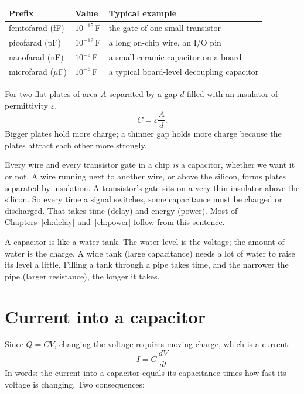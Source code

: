 \begin{center}
\begin{tabular}{lll}
\toprule
Prefix & Value & Typical example \\
\midrule
femtofarad (fF) & $10^{-15}$\,F & the gate of one small transistor \\
picofarad (pF) & $10^{-12}$\,F & a long on-chip wire, an I/O pin \\
nanofarad (nF) & $10^{-9}$\,F & a small ceramic capacitor on a board \\
microfarad ($\mu$F) & $10^{-6}$\,F & a typical board-level decoupling capacitor \\
\bottomrule
\end{tabular}
\end{center}

For two flat plates of area $A$ separated by a gap $d$ filled with an insulator of permittivity $\varepsilon$,
\[
  C = \varepsilon \frac{A}{d}.
\]
Bigger plates hold more charge; a thinner gap holds more charge because the plates attract each other more strongly.

\begin{bigidea}
Every wire and every transistor gate in a chip \emph{is} a capacitor, whether we want it or not. A wire running next to another wire, or above the silicon, forms plates separated by insulation. A transistor's gate sits on a very thin insulator above the silicon. So every time a signal switches, some capacitance must be charged or discharged. That takes time (delay) and energy (power). Most of Chapters~\ref{ch:delay} and~\ref{ch:power} follow from this sentence.
\end{bigidea}

\begin{everyday}
A capacitor is like a water tank. The water level is the voltage; the amount of water is the charge. A wide tank (large capacitance) needs a lot of water to raise its level a little. Filling a tank through a pipe takes time, and the narrower the pipe (larger resistance), the longer it takes.
\end{everyday}

\section{Current into a capacitor}

Since $Q = CV$, changing the voltage requires moving charge, which is a current:
\[
  \boxed{I = C\,\frac{dV}{dt}}
\]
In words: the current into a capacitor equals its capacitance times how fast its voltage is changing. Two consequences:


